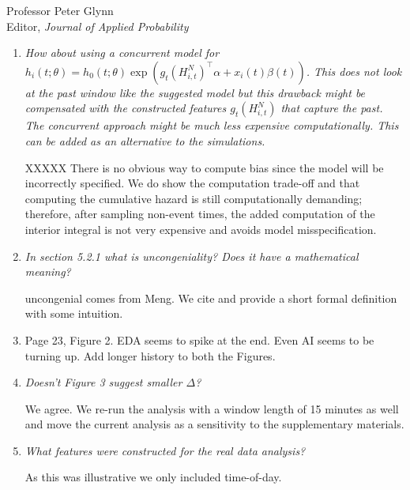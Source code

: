 \documentclass[11pt]{letter} %
\begin{document}
\begin{letter}{Professor
	Peter Glynn\\
	Editor, {\em Journal of Applied Probability}}
\begin{enumerate}
\vspace{5mm}
XXXXX
\vspace{5mm}

\item {\it How about using a concurrent model for $h_i (t;\theta) = h_0 (t; \theta) \exp (g_t (H_{i,t}^N)^\top \alpha + x_i (t) \beta (t))$. This does not look at the past window like the suggested model but this drawback might be compensated with the constructed features $g_t (H_{i,t}^N)$ that capture the past. The concurrent approach might be much less expensive computationally. This can be added as an alternative to the simulations.}

\vspace{5mm}
XXXXX
There is no obvious way to compute bias since the model will be incorrectly specified.  We do show the computation trade-off and that computing the cumulative hazard is still computationally demanding; therefore, after sampling non-event times, the added computation of the interior integral is not very expensive and avoids model misspecification.
\vspace{5mm}

\item {\it In section 5.2.1 what is uncongeniality? Does it have a mathematical
meaning?}

\vspace{5mm}
uncongenial comes from Meng. We cite and provide a short formal definition with some intuition.
\vspace{5mm}

\item Page 23, Figure 2. EDA seems to spike at the end. Even AI seems to be
turning up. Add longer history to both the Figures.


\item {\it Doesn’t Figure 3 suggest smaller $\Delta$?}

\vspace{5mm}
We agree.  We re-run the analysis with a window length of 15 minutes as well and move the current analysis as a sensitivity to the supplementary materials.
\vspace{5mm}

\item {\it What features were constructed for the real data analysis?}

\vspace{5mm}
As this was illustrative we only included time-of-day.
\vspace{5mm}


\end{enumerate}


\end{letter}
\end{document}
